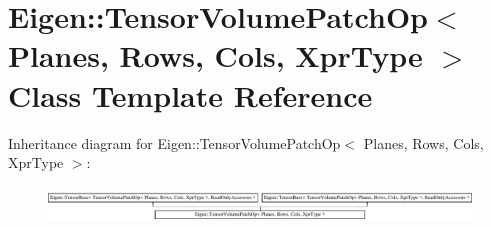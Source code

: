 \hypertarget{class_eigen_1_1_tensor_volume_patch_op}{}\section{Eigen\+:\+:Tensor\+Volume\+Patch\+Op$<$ Planes, Rows, Cols, Xpr\+Type $>$ Class Template Reference}
\label{class_eigen_1_1_tensor_volume_patch_op}
Inheritance diagram for Eigen\+:\+:Tensor\+Volume\+Patch\+Op$<$ Planes, Rows, Cols, Xpr\+Type $>$\+:\begin{figure}[H]
\begin{center}
\leavevmode
\includegraphics[height=0.938023cm]{class_eigen_1_1_tensor_volume_patch_op}
\end{center}
\end{figure}
